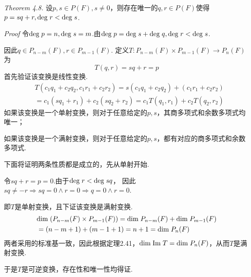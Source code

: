 \textit{Theorem 4.8.}
设\(p,s \in P(F),s \ne 0\)，则存在唯一的\(q,r \in P(F)\)使得\(p=sq+r,\mathrm{deg \;} r < \mathrm{deg \;} s\).

\textit{Proof}
令\(\mathrm{deg \;} p=n,\mathrm{deg \;} s=m\).由\(\mathrm{deg \;} p=\mathrm{deg \;} s+\mathrm{deg \;} q,\mathrm{deg \;} r < \mathrm{deg \;} s\).

因此\(q \in P_{n-m}(F),r \in P_{m-1}(F)\).
定义\(T:P_{n-m}(F) \times P_{m-1}(F) \rightarrow P_{n}(F)\)为 
    \begin{equation*}
        T(q,r)=sq+r=p
    \end{equation*}
首先验证该变换是线性变换.
    \begin{align*}
        &T(c_1q_1+c_2q_2,c_1r_1+c_2r_2)=s(c_1q_1+c_2q_2)+(c_1r_1+c_2r_2) \\
        &=c_1(sq_1+r_1)+c_2(sq_2+r_2)=c_1T(q_1,r_1)+c_2T(q_2,r_2)
    \end{align*}
如果该变换是一个单射变换，则对于任意给定的\(p,s\)，其商多项式和余数多项式均唯一；

如果该变换是一个满射变换，则对于任意给定的\(p,s\)，都有对应的商多项式和余数多项式.

下面将证明两条性质都是成立的，先从单射开始.

令\(sq+r=p=0\).由于\(\mathrm{deg \;} r < \mathrm{deg \;} sq\)，
因此\(sq \ne -r \Rightarrow sq=0 \wedge r=0 \Rightarrow q=0 \wedge r=0\).

即\(T\)是单射变换，且下证该变换是满射变换.
    \begin{align*}
        &\mathrm{dim \;} (P_{n-m}(F) \times P_{m-1}(F))=\mathrm{dim \;} P_{n-m}(F)+\mathrm{dim \;} P_{m-1}(F) \\
        &=(n-m+1)+(m-1+1)=n+1=\mathrm{dim \;} P_n(F)
    \end{align*}
两者采用的标准基一致，因此根据定理2.41，\(\mathrm{dim \;} \mathrm{Im \;} T=\mathrm{dim \;}  P_n(F)\)，从而\(T\)是满射变换.

于是\(T\)是可逆变换，存在性和唯一性均得证.

